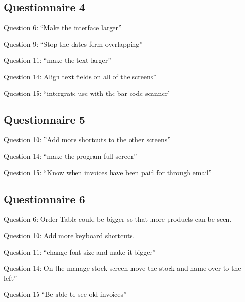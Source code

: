 \subsection{Questionnaire 4}

Question 6: ``Make the interface larger''

Question 9: ``Stop the dates form overlapping''

Question 11: ``make the text larger''

Question 14: Align text fields on all of the screens''

Question 15: ``intergrate use with the bar code scanner''

\subsection{Questionnaire 5}

Question 10: ''Add more shortcuts to the other screens''

Question 14: ``make the program full screen''

Question 15: ``Know when invoices have been paid for through email''

\subsection{Questionnaire 6}

Question 6: Order Table could be bigger so that more products can be seen.

Question 10: Add more keyboard shortcuts.

Question 11: ``change font size and make it bigger''

Question 14: On the manage stock screen move the stock and name over to the left''

Question 15 ``Be able to see old invoices''



